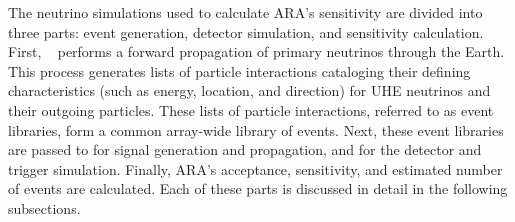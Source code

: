   The neutrino simulations used to calculate ARA's sensitivity are divided into three parts: event generation, detector simulation, and sensitivity calculation.
  First, \nuleptonsim{}~\citep{nuleptonsim} performs a forward propagation of primary neutrinos through the Earth.
  This process generates lists of particle interactions cataloging their defining characteristics (such as energy, location, and direction) for UHE neutrinos and their outgoing particles.
  These lists of particle interactions, referred to as event libraries, form a common array-wide library of events.
  Next, these event libraries are passed to \arasim{} for signal generation and propagation, and for the detector and trigger simulation.
  Finally, ARA's acceptance, sensitivity, and estimated number of events are calculated.
  Each of these parts is discussed in detail in the following subsections.


